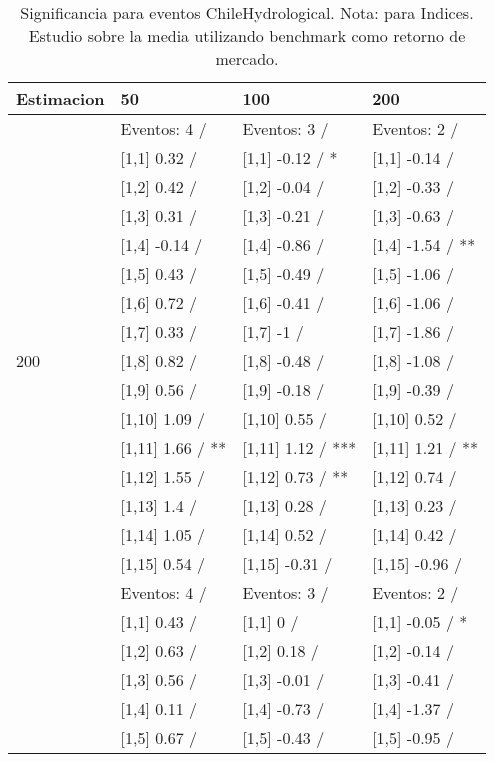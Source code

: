 \begin{table}

\caption{Significancia para eventos ChileHydrological. Nota: para Indices. Estudio sobre la media utilizando benchmark como retorno de mercado.}
\centering
\begin{tabular}[t]{llll}
\toprule
Estimacion & 50 & 100 & 200\\
\midrule
 & Eventos:  4 / & Eventos:  3 / & Eventos:  2 /\\
 & {}[1,1] 0.32  / & {}[1,1] -0.12  / * & {}[1,1] -0.14  /\\
 & {}[1,2] 0.42  / & {}[1,2] -0.04  / & {}[1,2] -0.33  /\\
 & {}[1,3] 0.31  / & {}[1,3] -0.21  / & {}[1,3] -0.63  /\\
 & {}[1,4] -0.14  / & {}[1,4] -0.86  / & {}[1,4] -1.54  / **\\
\addlinespace
 & {}[1,5] 0.43  / & {}[1,5] -0.49  / & {}[1,5] -1.06  /\\
 & {}[1,6] 0.72  / & {}[1,6] -0.41  / & {}[1,6] -1.06  /\\
 & {}[1,7] 0.33  / & {}[1,7] -1  / & {}[1,7] -1.86  /\\
200 & {}[1,8] 0.82  / & {}[1,8] -0.48  / & {}[1,8] -1.08  /\\
 & {}[1,9] 0.56  / & {}[1,9] -0.18  / & {}[1,9] -0.39  /\\
\addlinespace
 & {}[1,10] 1.09  / & {}[1,10] 0.55  / & {}[1,10] 0.52  /\\
 & {}[1,11] 1.66  / ** & {}[1,11] 1.12  / *** & {}[1,11] 1.21  / **\\
 & {}[1,12] 1.55  / & {}[1,12] 0.73  / ** & {}[1,12] 0.74  /\\
 & {}[1,13] 1.4  / & {}[1,13] 0.28  / & {}[1,13] 0.23  /\\
 & {}[1,14] 1.05  / & {}[1,14] 0.52  / & {}[1,14] 0.42  /\\
\addlinespace
 & {}[1,15] 0.54  / & {}[1,15] -0.31  / & {}[1,15] -0.96  /\\
 & Eventos:  4 / & Eventos:  3 / & Eventos:  2 /\\
 & {}[1,1] 0.43  / & {}[1,1] 0  / & {}[1,1] -0.05  / *\\
 & {}[1,2] 0.63  / & {}[1,2] 0.18  / & {}[1,2] -0.14  /\\
 & {}[1,3] 0.56  / & {}[1,3] -0.01  / & {}[1,3] -0.41  /\\
\addlinespace
 & {}[1,4] 0.11  / & {}[1,4] -0.73  / & {}[1,4] -1.37  /\\
 & {}[1,5] 0.67  / & {}[1,5] -0.43  / & {}[1,5] -0.95  /\\

\end{tabular}
\end{table}
